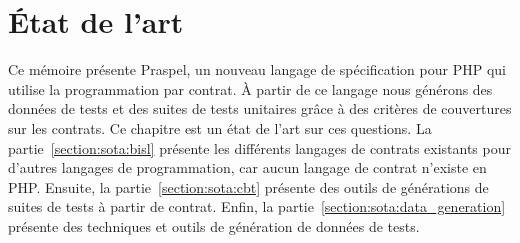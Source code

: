 \chapter{État de l'art}
\label{chapter:state}

\mminitoc

Ce mémoire présente Praspel, un nouveau langage de spécification pour PHP qui
utilise la programmation par contrat. À partir de ce langage nous générons des
données de tests et des suites de tests unitaires grâce à des critères de
couvertures sur les contrats. Ce chapitre est un état de l'art sur ces
questions. La partie~\ref{section:sota:bisl} présente les différents langages de
contrats existants pour d'autres langages de programmation, car aucun langage de
contrat n'existe en PHP. Ensuite, la partie~\ref{section:sota:cbt} présente des
outils de générations de suites de tests à partir de contrat. Enfin, la
partie~\ref{section:sota:data_generation} présente des techniques et outils de
génération de données de tests.

